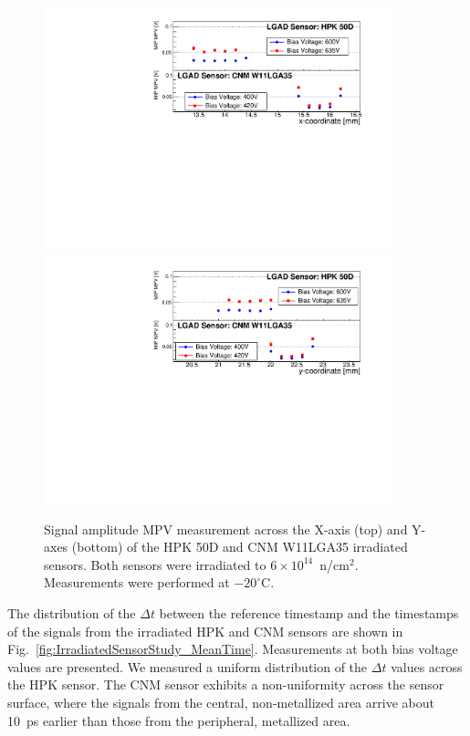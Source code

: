 \documentclass[preprint,1p]{elsarticle}
\begin{document}
\begin{figure}[htbp] 
\centering
\includegraphics[width=0.90\textwidth]{figs/USCSBoard_HPK50DIrradiated-CNMW11LGA35_Run936-961/IrradiatedSensorStudy_MPV_vs_X.pdf} 
\includegraphics[width=0.90\textwidth]{figs/USCSBoard_HPK50DIrradiated-CNMW11LGA35_Run936-961/IrradiatedSensorStudy_MPV_vs_Y.pdf} 
\caption{Signal amplitude MPV measurement across the X-axis (top) and Y-axes (bottom) of the HPK 50D and CNM W11LGA35 irradiated sensors. Both sensors were irradiated to $6\times 10^{14}$~n/cm$^2$. Measurements were performed at $-20^{\circ}$C.} 
\label{fig:IrradiatedSensorStudy_MPV} 
\end{figure}

The distribution of the $\Delta{t}$ between the reference timestamp and the
timestamps of the signals from the irradiated HPK and CNM sensors are shown in
Fig.~\ref{fig:IrradiatedSensorStudy_MeanTime}. Measurements at both bias voltage
values are presented. We measured a uniform distribution of the $\Delta{t}$
values across the HPK sensor. The CNM sensor exhibits a non-uniformity across
the sensor surface, where the signals from the central, non-metallized area
arrive about 10~ps earlier than those from the peripheral, metallized area. 
\end{document}
